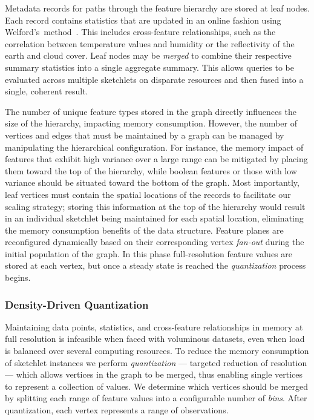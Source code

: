 Metadata records for paths through the feature hierarchy are stored at leaf nodes. Each record contains statistics that are updated in an online fashion using Welford's~method~\cite{welford1962note}. This includes cross-feature relationships, such as the correlation between temperature values and humidity or the reflectivity of the earth and cloud cover. Leaf nodes may be \emph{merged} to combine their respective summary statistics into a single aggregate summary. This allows queries to be evaluated across multiple sketchlets on disparate resources and then fused into a single, coherent result.

The number of unique feature types stored in the graph directly influences the size of the hierarchy, impacting memory consumption. However, the number of vertices and edges that must be maintained by a graph can be managed by manipulating the hierarchical configuration. For instance, the memory impact of features that exhibit high variance over a large range can be mitigated by placing them toward the top of the hierarchy, while boolean features or those with low variance should be situated toward the bottom of the graph. Most importantly, leaf vertices must contain the spatial locations of the records to facilitate our scaling strategy; storing this information at the top of the hierarchy would result in an individual sketchlet being maintained for each spatial location, eliminating the memory consumption benefits of the data structure. Feature planes are reconfigured dynamically based on their corresponding vertex \emph{fan-out} during the initial population of the graph. In this phase full-resolution feature values are stored at each vertex, but once a steady state is reached the \emph{quantization} process begins.

\subsubsection{Density-Driven Quantization}
Maintaining data points, statistics, and cross-feature relationships in memory at full resolution is infeasible when faced with voluminous datasets, even when load is balanced over several computing resources. To reduce the memory consumption of sketchlet instances we perform \emph{quantization} --- targeted reduction of resolution --- which allows vertices in the graph to be merged, thus enabling single vertices to represent a collection of values. We determine which vertices should be merged by splitting each range of feature values into a configurable number of \emph{bins}. After quantization, each vertex represents a range of observations.

